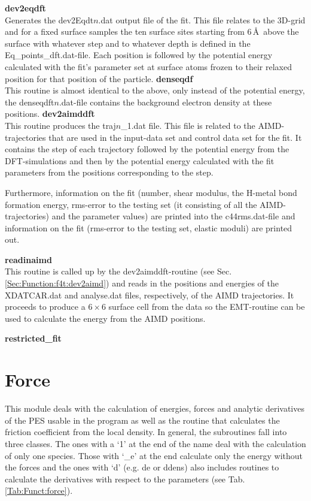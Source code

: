 \documentclass[twoside, 11pt, titlepage, captions=nooneline, a4paper, headsepline]{scrbook}%
\begin{document}
\textbf{dev2eqdft}\\
Generates the dev2Eqdt$n$.dat output file of the fit. This file relates to the 3D-grid and for a fixed surface samples the ten surface sites starting from 6\,\AA~above the surface with whatever step and to whatever depth is defined in the Eq\_points\_dft.dat-file. Each position is followed by the potential energy calculated with the fit's parameter set at surface atoms frozen to their relaxed position for that position of the particle.
\textbf{denseqdf}\\
This routine is almost identical to the above, only instead of the potential energy, the denseqdft$n$.dat-file contains the background electron density at these positions.
\textbf{dev2aimddft}\\
\label{Sec:Function:f4t:dev2aimd}
This routine produces the traj$n$\_1.dat file. This file is related to the AIMD-trajectories that are used in the input-data set and control data set for the fit. It contains the step of each trajectory followed by the potential energy from the DFT-simulations and then by the potential energy calculated with the fit parameters from the positions corresponding to the step.

Furthermore, information on the fit (number, shear modulus, the H-metal bond formation energy, rms-error to the testing set (it consisting of all the AIMD-trajectories) and the parameter values) are printed into the c44rms.dat-file and information on the fit (rms-error to the testing set, elastic moduli) are printed out.

\textbf{readinaimd}\\
This routine is called up by the dev2aimddft-routine (see Sec.\,\ref{Sec:Function:f4t:dev2aimd}) and reads in the positions and energies of the XDATCAR.dat and analyse.dat files, respectively, of the AIMD trajectories. It proceeds to produce a $6\times6$ surface cell from the data so the EMT-routine can be used to calculate the energy from the AIMD positions.

\textbf{restricted\_fit}\\

\section{Force}
This module deals with the calculation of energies, forces and analytic derivatives of the PES usable in the program as well as the routine that calculates the friction coefficient from the local density. In general, the subroutines fall into three classes. The ones with a `1' at the end of the name deal with the calculation of only one species. Those with `\_e' at the end calculate only the energy without the forces and the ones with `d' (e.g. de or ddens) also includes routines to calculate the derivatives with respect to the parameters (see Tab.\,\ref{Tab:Funct:force}).
\end{document}
